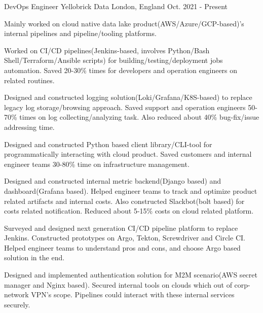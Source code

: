 

\begin{cventries}

    \cventry
        {DevOps Engineer}
        {Yellobrick Data}
        {London, England}
        {Oct. 2021 - Present}
        {
             \begin{cvitems}
                \item
                    {
                        Mainly worked on cloud native data lake product(AWS/Azure/GCP-based)'s internal pipelines and pipeline/tooling platforms. 
                    }
                \item
                    {
                        Worked on CI/CD pipelines(Jenkins-based, involves Python/Bash Shell/Terraform/Ansible scripts) for building/testing/deployment jobs automation. Saved 20-30\% times for developers and operation engineers on related routines.
                    }
                \item
                    {
                        Designed and constructed logging solution(Loki/Grafana/K8S-based) to replace legacy log storage/browsing approach. Saved support and operation engineers 50-70\% times on log collecting/analyzing task. Also reduced about 40\% bug-fix/issue addressing time. 
                    }
                \item
                    {
                        Designed and constructed Python based client library/CLI-tool for programmatically interacting with cloud product. Saved customers and internal engineer teams 30-80\% time on infrastructure management. 
                    }
                \item
                    {
                        Designed and constructed internal metric backend(Django based) and dashboard(Grafana based). Helped engineer teams to track and optimize product related artifacts and internal costs. Also constructed Slackbot(bolt based) for costs related notification. Reduced about 5-15\% costs on cloud related platform. 
                    }
                \item
                    {
                        Surveyed and designed next generation CI/CD pipeline platform to replace Jenkins. Constructed prototypes on Argo, Tekton, Screwdriver and Circle CI. Helped engineer teams to understand pros and cons, and choose Argo based solution in the end. 
                    }
                \item
                    {
                        Designed and implemented authentication solution for M2M scenario(AWS secret manager and Nginx based). Secured internal tools on clouds which out of corp-network VPN's scope. Pipelines could interact with these internal services securely.
                    }
             \end{cvitems}
        }


\end{cventries}
